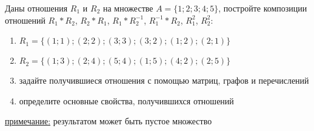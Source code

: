 \question
Даны отношения $R_1$ и $R_2$ на множестве $A = \{1; 2; 3; 4; 5\}$, постройте композиции отношений $R_1*R_2$, $R_2*R_1$,  $R_1*R_2^{-1}$, $R_1^{-1}*R_2$, $R_1^2$, $R_2^2$:
\begin{enumerate}
	\renewcommand{\labelenumi}{\alph{enumi})}
	\item $R_1 = \{(1; 1); (2; 2); (3; 3); (3; 2); (1; 2); (2; 1)\}$
	\item $R_2 = \{(1; 3); (2; 4); (5; 4); (1; 5); (4; 2); (2; 5)\}$
	\item задайте получившиеся отношения с помощью матриц, графов и перечислений 
	\item определите основные свойства, получившихся отношений
\end{enumerate}

\underline{примечание:} результатом может быть пустое множество
